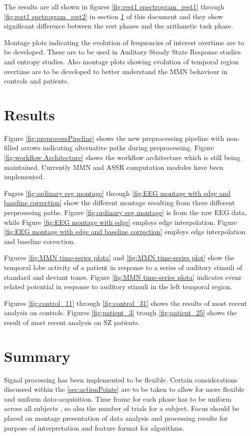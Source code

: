 \documentclass[conference]{IEEEconf}
\begin{document}
The results are all shown in figures \ref{fig:rest1 spectrogram_rest1} through \ref{fig:rest1 spetrogram_rest2} 
in section \ref{sec:results} of this document and they show significant difference between the rest phases and the 
arithmetic task phase.

Montage plots indicating the evolution of frequencies of interest overtime are to be developed. These are to be used 
in Auditory Steady State Response studies and entropy studies. Also montage plots showing evolution of temporal region 
overtime are to be developed to better understand the MMN behaviour in controls and patients.

\section{Results}\label{sec:results}
Figure \ref{fig:preprocessPipeline} shows the new preprocessing pipeline with non-filled arrows indicating alternative paths during preprocessing.
Figure \ref{fig:workflow Architecture} shows the workflow architecture which is still being maintained. Currently MMN and ASSR computation modules 
have been implemented.

Fugres \ref{fig:ordinary eeg montage} through \ref{fig:EEG montage with edge and baseline correction} show the different montage resulting from three different preproessing paths. 
Figure \ref{fig:ordinary eeg montage} is from the raw EEG data, while Figure \ref{fig:EEG montage with edge} employs edge interpolation.
Figure \ref{fig:EEG montage with edge and baseline correction} employs edge interpolation and baseline correction.

Figures \ref{fig:MMN time-series plota} and \ref{fig:MMN time-series plot} show the temporal lobe activity of a patient in response to a series of auditory stimuli of standard and deviant tones.
Figure \ref{fig:MMN time-series plota} indicates evenr related potential in response to auditory stimuli in the left temporal region.

Figures \ref{fig:control_11} through \ref{fig:control_31} shows the results of most recent analysis on controls.
Figures \ref{fig:patient_3} trough \ref{fig:patient_25} shows the result of most recent analysis on SZ patients.

\clearpage
\section{Summary}
Signal processing has been implemented to be flexible. Certain considerations discussed
within the \ref{sec:actionPoints} are to be taken to allow for more flexible
and uniform data-acquisition. Time frame for each phase has to be uniform across all subjects
, so also the number of trials for a subject. Focus should be placed on montage presentation 
of data analysis and processing results for purpose of interpretation and feature format for
 algorithms.
\end{document}
